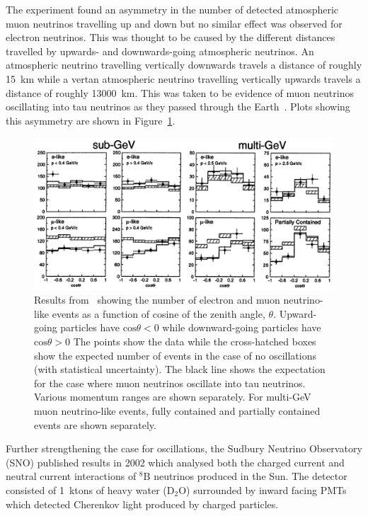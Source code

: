 The experiment found an asymmetry in the number of detected atmospheric muon neutrinos travelling up and down but no similar effect was observed for electron neutrinos.
This was thought to be caused by the different distances travelled by upwards- and downwards-going atmospheric neutrinos.
An atmospheric neutrino travelling vertically downwards travels a distance of roughly 15~km while a vertan atmospheric neutrino travelling vertically upwards travels a distance of roughly 13000~km.
This was taken to be evidence of muon neutrinos oscillating into tau neutrinos as they passed through the Earth~\cite{superK}.
Plots showing this asymmetry are shown in Figure~\ref{fig:superKResults}.

\begin{figure}[h]
  \centering
  \includegraphics[width=\linewidth]{files/figures/historical_context/superKResults}
  \caption{Results from~\cite{superK} showing the number of electron and muon neutrino-like events as a function of cosine of the zenith angle, $\theta$. Upward-going particles have $\text{cos}\theta<0$ while downward-going particles have $\text{cos}\theta>0$ The points show the data while the cross-hatched boxes show the expected number of events in the case of no oscillations (with statistical uncertainty). The black line shows the expectation for the case where muon neutrinos oscillate into tau neutrinos. Various momentum ranges are shown separately. For multi-GeV muon neutrino-like events, fully contained and partially contained events are shown separately.}
  \label{fig:superKResults}
\end{figure}

Further strengthening the case for oscillations, the Sudbury Neutrino Observatory (SNO) published results in 2002 which analysed both the charged current and neutral current interactions of $^{8}\text{B}$ neutrinos produced in the Sun.
The detector consisted of 1~ktons of heavy water ($\text{D}_{2}\text{O}$) surrounded by inward facing PMTs which detected Cherenkov light produced by charged particles.

